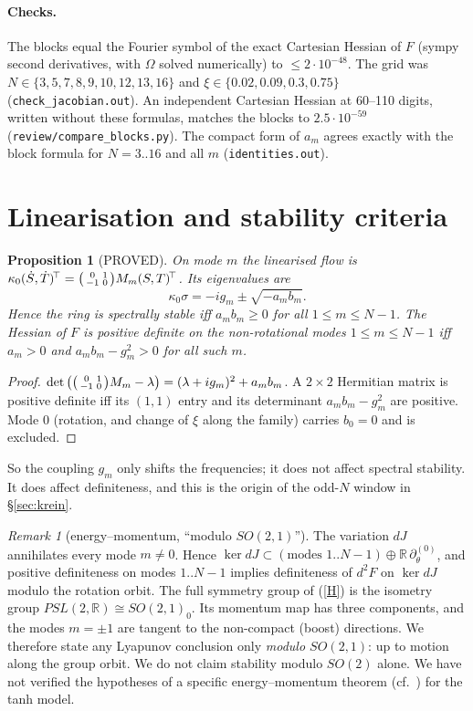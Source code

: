 \documentclass[11pt]{article}
\newtheorem{proposition}[theorem]{Proposition}
\theoremstyle{remark}
\newtheorem{remark}[theorem]{Remark}
\begin{document}
\paragraph{Checks.} The blocks equal the Fourier symbol of the exact Cartesian Hessian of $F$ (sympy second
derivatives, with $\Omega$ solved numerically) to $\le2\cdot10^{-48}$. The grid was $N\in\{3,5,7,8,9,10,12,13,16\}$ and
$\xi\in\{0.02,0.09,0.3,0.75\}$ (\texttt{check\_jacobian.out}). An independent Cartesian Hessian at 60--110 digits,
written without these formulas, matches the blocks to $2.5\cdot10^{-59}$ (\texttt{review/compare\_blocks.py}). The compact
form of $a_m$ agrees exactly with the block formula for $N=3..16$ and all $m$ (\texttt{identities.out}).

\section{Linearisation and stability criteria}
\begin{proposition}[PROVED]\label{prop:lin}
On mode $m$ the linearised flow is $\kappa_0(\dot S,\dot T)^{\!\top}=\begin{psmallmatrix}0&1\\-1&0\end{psmallmatrix}M_m(S,T)^{\!\top}$.
Its eigenvalues are
\[
\kappa_0\sigma=-ig_m\pm\sqrt{-a_mb_m}.
\]
Hence the ring is spectrally stable iff $a_mb_m\ge0$ for all $1\le m\le N-1$. The Hessian of $F$ is positive definite on
the non-rotational modes $1\le m\le N-1$ iff $a_m>0$ and $a_mb_m-g_m^2>0$ for all such $m$.
\end{proposition}
\begin{proof}
$\det\big(\begin{psmallmatrix}0&1\\-1&0\end{psmallmatrix}M_m-\lambda\big)=(\lambda+ig_m)^2+a_mb_m$. A $2\times2$ Hermitian
matrix is positive definite iff its $(1,1)$ entry and its determinant $a_mb_m-g_m^2$ are positive. Mode $0$ (rotation, and
change of $\xi$ along the family) carries $b_0=0$ and is excluded.
\end{proof}
So the coupling $g_m$ only shifts the frequencies; it does not affect spectral stability. It does affect
definiteness, and this is the origin of the odd-$N$ window in \S\ref{sec:krein}.

\begin{remark}[energy--momentum, ``modulo $SO(2,1)$'']\label{rem:em}
The variation $dJ$ annihilates every mode $m\ne0$. Hence $\ker dJ\subset(\text{modes }1..N-1)\oplus\mathbb R\,\partial_\theta^{(0)}$,
and positive definiteness on modes $1..N-1$ implies definiteness of $d^2F$ on $\ker dJ$ modulo the rotation orbit.
The full symmetry group of (\ref{H}) is the isometry group $PSL(2,\mathbb R)\cong SO(2,1)_0$. Its momentum map has
three components, and the modes $m=\pm1$ are tangent to the non-compact (boost) directions. We therefore state any
Lyapunov conclusion only \emph{modulo $SO(2,1)$}: up to motion along the group orbit. We do not claim stability modulo
$SO(2)$ alone. We have not verified the hypotheses of a specific energy--momentum theorem (cf.~\cite[Thm.~2]{MT}) for the tanh
model.
\end{remark}
\end{document}
